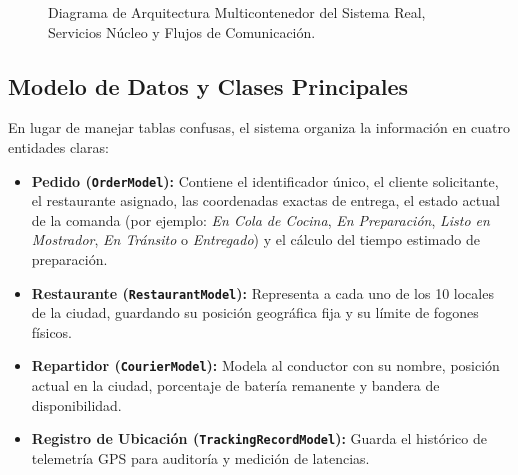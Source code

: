 \documentclass[11pt,a4paper]{article}
\begin{document}
\begin{figure}[htbp]
{%
}
\caption{Diagrama de Arquitectura Multicontenedor del Sistema Real, Servicios Núcleo y Flujos de Comunicación.}
\label{fig:arquitectura_sistema}
\end{figure}

\subsection{Modelo de Datos y Clases Principales}
En lugar de manejar tablas confusas, el sistema organiza la información en cuatro entidades claras:
\begin{itemize}[leftmargin=*]
    \item \textbf{Pedido (\texttt{OrderModel}):} Contiene el identificador único, el cliente solicitante, el restaurante asignado, las coordenadas exactas de entrega, el estado actual de la comanda (por ejemplo: \textit{En Cola de Cocina}, \textit{En Preparación}, \textit{Listo en Mostrador}, \textit{En Tránsito} o \textit{Entregado}) y el cálculo del tiempo estimado de preparación.
    \item \textbf{Restaurante (\texttt{RestaurantModel}):} Representa a cada uno de los 10 locales de la ciudad, guardando su posición geográfica fija y su límite de fogones físicos.
    \item \textbf{Repartidor (\texttt{CourierModel}):} Modela al conductor con su nombre, posición actual en la ciudad, porcentaje de batería remanente y bandera de disponibilidad.
    \item \textbf{Registro de Ubicación (\texttt{TrackingRecordModel}):} Guarda el histórico de telemetría GPS para auditoría y medición de latencias.
\end{itemize}
\end{document}
